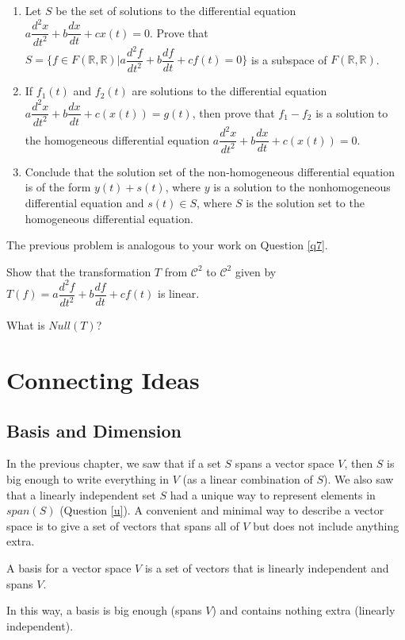 \bq \begin{enumerate}
\item Let $S$ be the set of solutions to the differential equation $a\dfrac{d^2x}{dt^2}+b\dfrac{dx}{dt}+c x(t)= 0$. Prove that $S=\{f \in F(\mathbb{R},\mathbb{R}) | a\dfrac{d^2f}{dt^2}+b\dfrac{df}{dt}+c f(t)= 0 \}$  is a subspace of $F(\mathbb{R},\mathbb{R})$.
\item If $f_1(t)$ and $f_2(t)$ are solutions to the differential equation $a\dfrac{d^2x}{dt^2}+b\dfrac{dx}{dt}+c (x(t))= g(t)$, then prove that $f_1-f_2$ is a solution to the homogeneous differential equation $a\dfrac{d^2x}{dt^2}+b\dfrac{dx}{dt}+c (x(t))= 0$.
\item Conclude that the solution set of the non-homogeneous differential equation is of the form $y(t)+s(t)$, where $y$ is a solution to the nonhomogeneous differential equation and $s(t) \in S$, where $S$ is the solution set to the homogeneous differential equation.
\end{enumerate}
\eq
The previous problem is analogous to your work on Question \ref{q7}.
\bq \be
\item Show that the transformation $T$ from $\mathcal{C}^2$ to $\mathcal{C}^2$ given by $T(f)=a\dfrac{d^2f}{dt^2}+b\dfrac{df}{dt}+c f(t)$ is linear.
\item What is $Null(T)$?
\ee
\eq

\chapter{Connecting Ideas}

\section{Basis and Dimension}
In the previous chapter, we saw that if a set $S$ spans a vector space $V$, then $S$ is big enough to write everything in $V$ (as a linear combination of $S$). We also saw that a linearly independent set $S$ had a unique way to represent elements in $span(S)$ (Question \ref{u}). A convenient and minimal way to describe a vector space is to give a set of vectors that spans all of $V$ but does not include anything extra.
\begin{definition} A basis for a vector space $V$ is a set of vectors that is linearly independent and spans $V$.
\end{definition}
In this way, a basis is big enough (spans $V$) and contains nothing extra (linearly independent).


